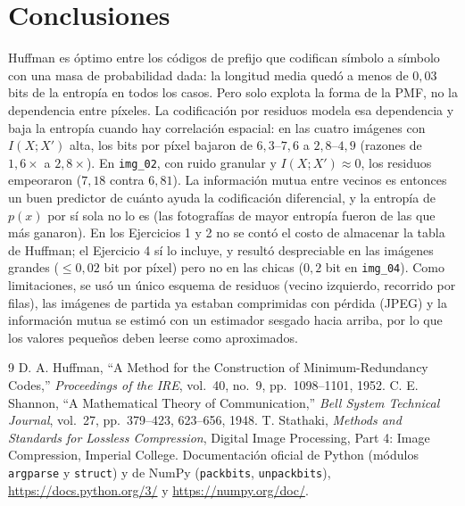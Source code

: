 \documentclass[11pt,a4paper]{article}
\begin{document}
\section{Conclusiones}
Huffman es óptimo entre los códigos de prefijo que codifican símbolo a símbolo con una masa de probabilidad dada: la longitud media quedó a menos de $0{,}03$ bits de la entropía en todos los casos. Pero solo explota la forma de la PMF, no la dependencia entre píxeles. La codificación por residuos modela esa dependencia y baja la entropía cuando hay correlación espacial: en las cuatro imágenes con $I(X;X')$ alta, los bits por píxel bajaron de $6{,}3$--$7{,}6$ a $2{,}8$--$4{,}9$ (razones de $1{,}6\times$ a $2{,}8\times$). En \texttt{img\_02}, con ruido granular y $I(X;X')\approx 0$, los residuos empeoraron ($7{,}18$ contra $6{,}81$). La información mutua entre vecinos es entonces un buen predictor de cuánto ayuda la codificación diferencial, y la entropía de $p(x)$ por sí sola no lo es (las fotografías de mayor entropía fueron de las que más ganaron). En los Ejercicios 1 y 2 no se contó el costo de almacenar la tabla de Huffman; el Ejercicio 4 sí lo incluye, y resultó despreciable en las imágenes grandes ($\le 0{,}02$ bit por píxel) pero no en las chicas ($0{,}2$ bit en \texttt{img\_04}).
Como limitaciones, se usó un único esquema de residuos (vecino izquierdo, recorrido por filas), las imágenes de partida ya estaban comprimidas con pérdida (JPEG) y la información mutua se estimó con un estimador sesgado hacia arriba, por lo que los valores pequeños deben leerse como aproximados.

\begin{thebibliography}{9}
 D. A. Huffman, ``A Method for the Construction of Minimum-Redundancy Codes,'' \textit{Proceedings of the IRE}, vol.~40, no.~9, pp.~1098--1101, 1952.
 C. E. Shannon, ``A Mathematical Theory of Communication,'' \textit{Bell System Technical Journal}, vol.~27, pp.~379--423, 623--656, 1948.
 T. Stathaki, \textit{Methods and Standards for Lossless Compression}, Digital Image Processing, Part 4: Image Compression, Imperial College.
 Documentación oficial de Python (módulos \texttt{argparse} y \texttt{struct}) y de NumPy (\texttt{packbits}, \texttt{unpackbits}), \url{https://docs.python.org/3/} y \url{https://numpy.org/doc/}.
\end{thebibliography}
\end{document}
